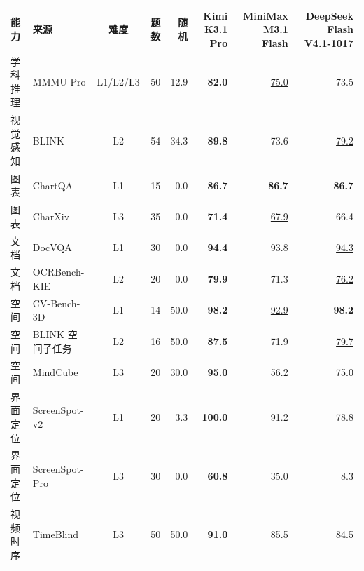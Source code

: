 \begin{tabular}{llcrrrrr}
\toprule
能力 & 来源 & 难度 & 题数 & 随机 & Kimi K3.1 Pro & MiniMax M3.1 Flash & DeepSeek Flash V4.1-1017 \\
\midrule
学科推理 & MMMU-Pro & L1/L2/L3 & 50 & 12.9 & \textbf{82.0} & \underline{75.0} & 73.5 \\
视觉感知 & BLINK & L2 & 54 & 34.3 & \textbf{89.8} & 73.6 & \underline{79.2} \\
图表 & ChartQA & L1 & 15 & 0.0 & \textbf{86.7} & \textbf{86.7} & \textbf{86.7} \\
图表 & CharXiv & L3 & 35 & 0.0 & \textbf{71.4} & \underline{67.9} & 66.4 \\
文档 & DocVQA & L1 & 30 & 0.0 & \textbf{94.4} & 93.8 & \underline{94.3} \\
文档 & OCRBench-KIE & L2 & 20 & 0.0 & \textbf{79.9} & 71.3 & \underline{76.2} \\
空间 & CV-Bench-3D & L1 & 14 & 50.0 & \textbf{98.2} & \underline{92.9} & \textbf{98.2} \\
空间 & BLINK 空间子任务 & L2 & 16 & 50.0 & \textbf{87.5} & 71.9 & \underline{79.7} \\
空间 & MindCube & L3 & 20 & 30.0 & \textbf{95.0} & 56.2 & \underline{75.0} \\
界面定位 & ScreenSpot-v2 & L1 & 20 & 3.3 & \textbf{100.0} & \underline{91.2} & 78.8 \\
界面定位 & ScreenSpot-Pro & L3 & 30 & 0.0 & \textbf{60.8} & \underline{35.0} & 8.3 \\
视频时序 & TimeBlind & L3 & 50 & 50.0 & \textbf{91.0} & \underline{85.5} & 84.5 \\
\bottomrule
\end{tabular}
